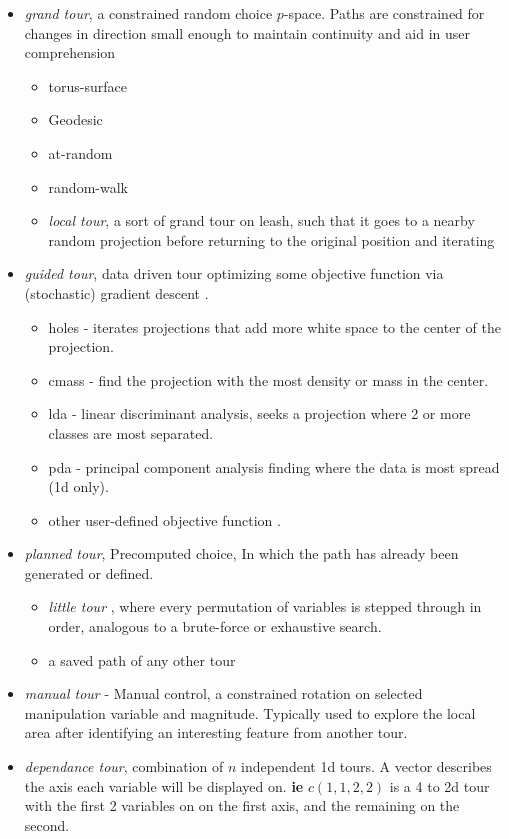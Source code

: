\documentclass{monashthesis}
\begin{document}
\begin{itemize}
\item
  \emph{grand tour}, a constrained random choice \(p\)-space. Paths are constrained for changes in direction small enough to maintain continuity and aid in user comprehension

  \begin{itemize}
  \tightlist
  \item
    torus-surface \autocite{asimov_grand_1985}
  \item
    Geodesic
  \item
    at-random
  \item
    random-walk
  \item
    \emph{local tour}, a sort of grand tour on leash, such that it goes to a nearby random projection before returning to the original position and iterating
  \end{itemize}
\item
  \emph{guided tour}, data driven tour optimizing some objective function via (stochastic) gradient descent \autocite{hurley_analyzing_1990}.

  \begin{itemize}
  \tightlist
  \item
    holes \autocite{cook_projection_1993} - iterates projections that add more white space to the center of the projection.
  \item
    cmass \autocite{cook_projection_1993} - find the projection with the most density or mass in the center.
  \item
    lda \autocite{lee_projection_2005} - linear discriminant analysis, seeks a projection where 2 or more classes are most separated.
  \item
    pda - principal component analysis finding where the data is most spread (1d only).
  \item
    other user-defined objective function \autocite{wickham_tourr_2011}.
  \end{itemize}
\item
  \emph{planned tour}, Precomputed choice, In which the path has already been generated or defined.

  \begin{itemize}
  \tightlist
  \item
    \emph{little tour} \autocite{mcdonald_interactive_1982}, where every permutation of variables is stepped through in order, analogous to a brute-force or exhaustive search.
  \item
    a saved path of any other tour
  \end{itemize}
\item
  \emph{manual tour} - Manual control, a constrained rotation on selected manipulation variable and magnitude\autocite{cook_manual_1997}. Typically used to explore the local area after identifying an interesting feature from another tour.
\item
  \emph{dependance tour}, combination of \(n\) independent 1d tours. A vector describes the axis each variable will be displayed on. \textbf{ie} \(c(1, 1, 2, 2)\) is a 4 to 2d tour with the first 2 variables on on the first axis, and the remaining on the second.


\end{itemize}
\end{document}
